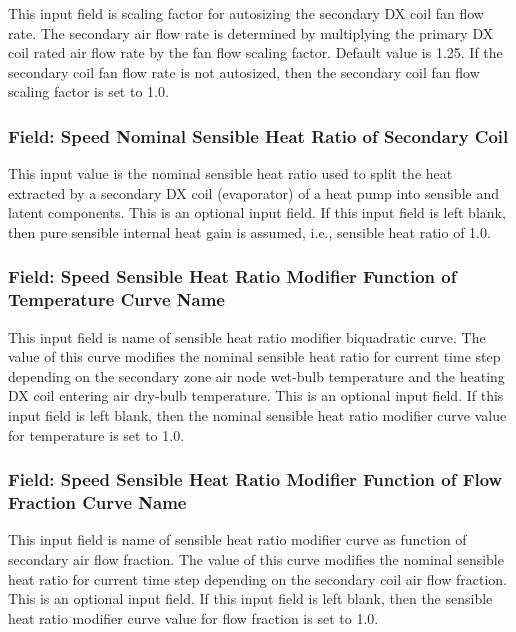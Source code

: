 This input field is scaling factor for autosizing the secondary DX coil fan flow rate. The secondary air flow rate is determined by multiplying the primary DX coil rated air flow rate by the fan flow scaling factor. Default value is 1.25. If the secondary coil fan flow rate is not autosized, then the secondary coil fan flow scaling factor is set to 1.0.

\subsubsection{Field: Speed Nominal Sensible Heat Ratio of Secondary Coil}\label{field-speed-nominal-sensible-heat-ratio-of-secondary-coil}

This input value is the nominal sensible heat ratio used to split the heat extracted by a secondary DX coil (evaporator) of a heat pump into sensible and latent components. This is an optional input field. If this input field is left blank, then pure sensible internal heat gain is assumed, i.e., sensible heat ratio of 1.0.

\subsubsection{Field: Speed Sensible Heat Ratio Modifier Function of Temperature Curve Name}\label{field-speed-sensible-heat-ratio-modifier-function-of-temperature-curve-name}

This input field is name of sensible heat ratio modifier biquadratic curve. The value of this curve modifies the nominal sensible heat ratio for current time step depending on the secondary zone air node wet-bulb temperature and the heating DX coil entering air dry-bulb temperature. This is an optional input field. If this input field is left blank, then the nominal sensible heat ratio modifier curve value for temperature is set to 1.0.

\subsubsection{Field: Speed Sensible Heat Ratio Modifier Function of Flow Fraction Curve Name}\label{field-speed-sensible-heat-ratio-modifier-function-of-flow-fraction-curve-name}

This input field is name of sensible heat ratio modifier curve as function of secondary air flow fraction. The value of this curve modifies the nominal sensible heat ratio for current time step depending on the secondary coil air flow fraction. This is an optional input field. If this input field is left blank, then the sensible heat ratio modifier curve value for flow fraction is set to 1.0.

